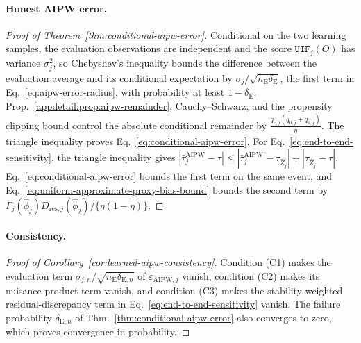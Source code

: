\paragraph{Honest AIPW error.}
\begin{proof}[Proof of Theorem~\ref{thm:conditional-aipw-error}]
 Conditional on the two learning samples, the evaluation observations are independent and the score $\mathtt{UIF}_j(O)$ has variance $\sigma_j^2$, so Chebyshev's inequality bounds the difference between the evaluation average and its conditional expectation by $\sigma_j/\sqrt{n_{\mathrm E}\delta_{\mathrm E}}$, the first term in Eq.~\eqref{eq:aipw-error-radius}, with probability at least $1-\delta_{\mathrm E}$. Prop.~\ref{appdetail:prop:aipw-remainder}, Cauchy--Schwarz, and the propensity clipping bound control the absolute conditional remainder by
\(\frac{q_{e,j}(q_{0,j}+q_{1,j})}{\eta}.\)
The triangle inequality proves Eq.~\eqref{eq:conditional-aipw-error}.
For Eq.~\eqref{eq:end-to-end-sensitivity}, the triangle inequality gives $|\widehat\tau_j^{\mathrm{AIPW}}-\tau|\le|\widehat\tau_j^{\mathrm{AIPW}}-\tau_{\widehat Z_j}|+|\tau_{\widehat Z_j}-\tau|$. Eq.~\eqref{eq:conditional-aipw-error} bounds the first term on the same event, and Eq.~\eqref{eq:uniform-approximate-proxy-bias-bound} bounds the second term by $\Gamma_j(\widehat\phi_j)D_{\mathrm{res},j}(\widehat\phi_j)/\{\eta(1-\eta)\}$.
\end{proof}

\paragraph{Consistency.}
\begin{proof}[Proof of Corollary~\ref{cor:learned-aipw-consistency}]
 Condition (C1) makes the evaluation term $\sigma_{j,n}/\sqrt{n_{\mathrm E}\delta_{\mathrm E,n}}$ of $\varepsilon_{\mathrm{AIPW},j}$ vanish, condition (C2) makes its nuisance-product term vanish, and condition (C3) makes the stability-weighted residual-discrepancy term in Eq.~\eqref{eq:end-to-end-sensitivity} vanish. The failure probability $\delta_{\mathrm E,n}$ of Thm.~\ref{thm:conditional-aipw-error} also converges to zero, which proves convergence in probability.
\end{proof}

